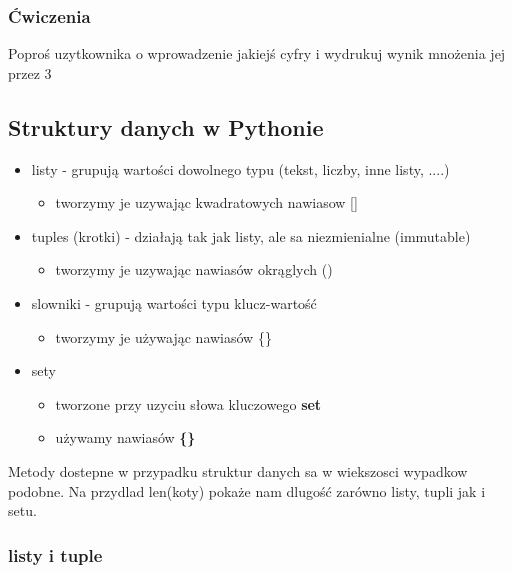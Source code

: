 \documentclass[11pt]{article}
\providecommand{\tightlist}{%
      \setlength{\itemsep}{0pt}\setlength{\parskip}{0pt}}
\begin{document}
    \subsubsection{Ćwiczenia}\label{ux107wiczenia}

Poproś uzytkownika o wprowadzenie jakiejś cyfry i wydrukuj wynik
mnożenia jej przez 3

    \subsection{Struktury danych w
Pythonie}\label{struktury-danych-w-pythonie}

\begin{itemize}
\tightlist
\item
  listy - grupują wartości dowolnego typu (tekst, liczby, inne listy,
  ....)

  \begin{itemize}
  \tightlist
  \item
    tworzymy je uzywając kwadratowych nawiasow {[}{]}
  \end{itemize}
\item
  tuples (krotki) - działają tak jak listy, ale sa niezmienialne
  (immutable)

  \begin{itemize}
  \tightlist
  \item
    tworzymy je uzywając nawiasów okrąglych ()
  \end{itemize}
\item
  slowniki - grupują wartości typu klucz-wartość

  \begin{itemize}
  \tightlist
  \item
    tworzymy je używając nawiasów \{\}
  \end{itemize}
\item
  sety

  \begin{itemize}
  \tightlist
  \item
    tworzone przy uzyciu słowa kluczowego \textbf{set}
  \item
    używamy nawiasów \textbf{\{\}}
  \end{itemize}
\end{itemize}

Metody dostepne w przypadku struktur danych sa w wiekszosci wypadkow
podobne. Na przydlad len(koty) pokaże nam dlugość zarówno listy, tupli
jak i setu.

    \subsubsection{listy i tuple}\label{listy-i-tuple}
\end{document}

